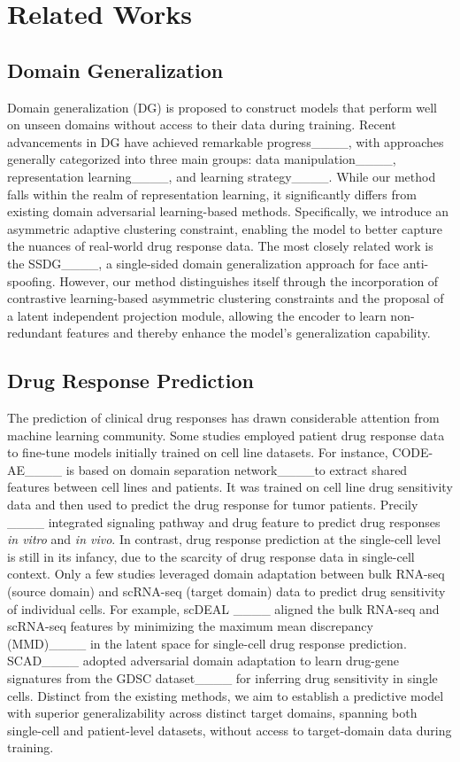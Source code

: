 \section{Related Works}
\subsection{Domain Generalization}
Domain generalization (DG) is proposed to construct models that perform well on unseen domains without access to their data during training. Recent advancements in DG have achieved remarkable progress____, with approaches generally categorized into three main groups: data manipulation____, representation learning____, and learning strategy____. While our method falls within the realm of representation learning, it significantly differs from existing domain adversarial learning-based methods. Specifically, we introduce an asymmetric adaptive clustering constraint, enabling the model to better capture the nuances of real-world drug response data. The most closely related work is the SSDG____, a single-sided domain generalization approach for face anti-spoofing. However, our method distinguishes itself through the incorporation of contrastive learning-based asymmetric clustering constraints and the proposal of a latent independent projection module, allowing the encoder to learn non-redundant features and thereby enhance the model's generalization capability.


\subsection{Drug Response Prediction}
The prediction of clinical drug responses has drawn considerable attention from machine learning community. Some studies employed patient drug response data to fine-tune models initially trained on cell line datasets. For instance, CODE-AE____ is based on domain separation network____to extract shared features between cell lines and patients. It was trained on cell line drug sensitivity data and then used to predict the drug response for tumor patients. Precily ____ integrated signaling pathway and drug feature to predict drug responses \textit{in vitro} and \textit{in vivo}. In contrast, drug response prediction at the single-cell level is still in its infancy, due to the scarcity of drug response data in single-cell context. Only a few studies leveraged domain adaptation between bulk RNA-seq (source domain) and scRNA-seq (target domain) data to predict drug sensitivity of individual cells. For example, scDEAL ____ aligned the bulk RNA-seq and scRNA-seq features by minimizing the maximum mean discrepancy (MMD)____ in the latent space for single-cell drug response prediction. SCAD____ adopted adversarial domain adaptation to learn drug-gene signatures from the GDSC dataset____ for inferring drug sensitivity in single cells. Distinct from the existing methods, we aim to establish a predictive model with superior generalizability across distinct target domains, spanning both single-cell and patient-level datasets, without access to target-domain data during training.